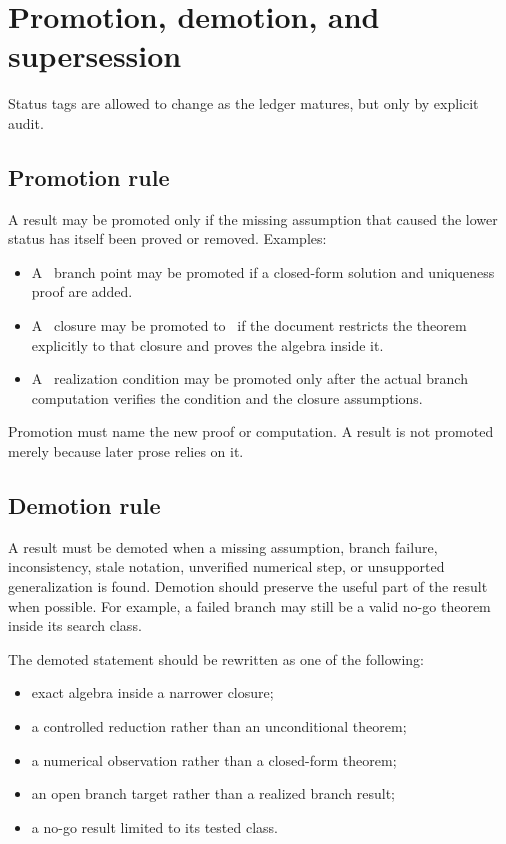 \section{Promotion, demotion, and supersession}
\label{sec:promotion-demotion-supersession}

Status tags are allowed to change as the ledger matures, but only by explicit audit.

\subsection{Promotion rule}
\label{subsec:promotion-rule}

A result may be promoted only if the missing assumption that caused the lower status has itself been proved or removed.  Examples:
\begin{itemize}[leftmargin=2.2em]
  \item A \StatusNumerical\ branch point may be promoted if a closed-form solution and uniqueness proof are added.
  \item A \StatusEffective\ closure may be promoted to \StatusExactClosure\ if the document restricts the theorem explicitly to that closure and proves the algebra inside it.
  \item A \StatusOpen\ realization condition may be promoted only after the actual branch computation verifies the condition and the closure assumptions.
\end{itemize}

Promotion must name the new proof or computation.  A result is not promoted merely because later prose relies on it.

\subsection{Demotion rule}
\label{subsec:demotion-rule}

A result must be demoted when a missing assumption, branch failure, inconsistency, stale notation, unverified numerical step, or unsupported generalization is found.  Demotion should preserve the useful part of the result when possible.  For example, a failed branch may still be a valid no-go theorem inside its search class.

The demoted statement should be rewritten as one of the following:
\begin{itemize}[leftmargin=2.2em]
  \item exact algebra inside a narrower closure;
  \item a controlled reduction rather than an unconditional theorem;
  \item a numerical observation rather than a closed-form theorem;
  \item an open branch target rather than a realized branch result;
  \item a no-go result limited to its tested class.
\end{itemize}

